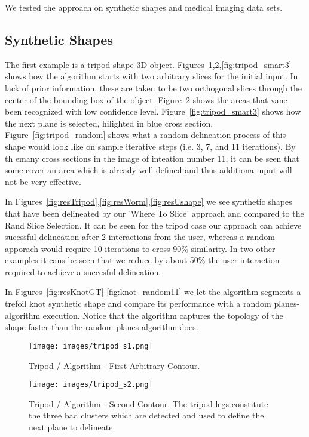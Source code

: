 We tested the approach on synthetic shapes and medical imaging data sets.

\subsection{Synthetic Shapes}
The first example is a tripod shape 3D object. Figures~\ref{fig:tripod_smart1},\ref{fig:tripod_smart2},\ref{fig:tripod_smart3} shows how the algorithm starts with two arbitrary slices for the initial input. In lack of prior information, these are taken to be two orthogonal slices through the center of the bounding box of the object. Figure~\ref{fig:tripod_smart2} shows the areas that vane been recognized with low confidence level. Figure~\ref{fig:tripod_smart3} shows how the next plane is selected, hilighted in blue cross section. Figure~\ref{fig:tripod_random} shows what a random delineation process of this shape would look like on sample iterative steps (i.e. 3, 7, and 11 iterations). By th emany cross sections in the image of inteation number 11, it can be seen that some cover an area which is already well defined and thus additiona input will not be very effective. 

In Figures~\ref{fig:resTripod},\ref{fig:resWorm},\ref{fig:resUshape} we see synthetic shapes that have been delineated by our 'Where To Slice' approach and compared to the Rand Slice Selection. It can be seen for the tripod case our approach can achieve sucessful delineation after 2 interactions from the user, whereas a random apporach would require 10 iterations to cross 90\% similarity. In two other examples it cans be seen that we reduce by about 50\% the user interaction required to achieve a succesful delineation.

In Figures~\ref{fig:resKnotGT}-\ref{fig:knot_random11} we let the algorithm segments a trefoil knot synthetic shape and compare its performance with a random planes-algorithm execution.
Notice that the algorithm captures the topology of the shape faster than the random planes algorithm does.

\begin{figure}[p]
\centering
  \texttt{[image: images/tripod\_s1.png]}
  \caption[Tripod / Algorithm - First Arbitrary Contour]{
  Tripod / Algorithm - First Arbitrary Contour.
  } \label{fig:tripod_smart1}
\end{figure}

\begin{figure}[p]
\centering
  \texttt{[image: images/tripod\_s2.png]}
  \caption[Tripod / Algorithm - Second Contour]{
  Tripod / Algorithm - Second Contour.
  The tripod legs constitute the three bad clusters which are detected and used to define the next plane to delineate.
  } \label{fig:tripod_smart2}
\end{figure}

